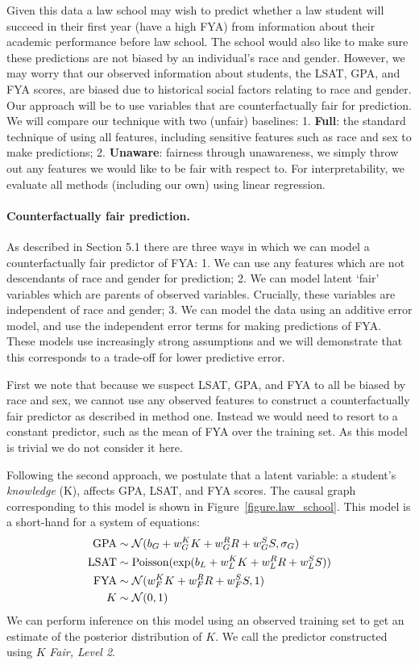 Given this data a law school may wish to predict whether a law student
will succeed in their first year (have a high FYA) from information about their academic performance 
before law school. The school would also like to make sure
these predictions are not biased by an individual's race and
gender. However, we may worry that our observed information about
students, the LSAT, GPA, and FYA scores, are biased due to historical
social factors relating to race and gender. Our approach will be to use variables that are counterfactually fair for prediction. We will compare our technique with two (unfair) baselines: 1. \textbf{Full}: the standard technique of using all features, including sensitive features such as race and sex to make predictions; 2. \textbf{Unaware}: fairness through unawareness, we simply throw out any features we would like to be fair with respect to. For interpretability, we evaluate all methods (including our own) using linear regression.


\paragraph{Counterfactually fair prediction.}
As described in Section 5.1 there are three ways in which we can model a counterfactually fair predictor of FYA: 1. We can use any features which are not descendants of race and gender for prediction; 2. We can model latent `fair' variables which are parents of observed variables. Crucially, these variables are independent of race and gender; 3. We can model the data using an additive error model, and use the independent error terms for making predictions of FYA. These models use increasingly strong assumptions and we will demonstrate that this corresponds to a trade-off for lower predictive error.

First we note that because we suspect LSAT, GPA, and FYA to all be biased by race and sex, we cannot use any observed features to construct a counterfactually fair predictor as described in method one. Instead we would need to resort to a constant predictor, such as the mean of FYA over the training set. As this model is trivial we do not consider it here. 

Following the second approach, we postulate that a latent variable: a student's \emph{knowledge} (K), affects GPA, LSAT, and FYA scores. The causal graph corresponding to this model is shown in Figure~\ref{figure.law_school}. This model is a short-hand for a system of equations:
\begin{align}
\mbox{GPA} &\sim {\cal N}(b_{G} + w_{G}^K K + w_{G}^R R + w_{G}^S S, \sigma_{G}) \nonumber \\
\mbox{LSAT} &\sim \textrm{Poisson}(\exp(b_{L} + w_{L}^K K + w_{L}^R R + w_{L}^S S)) \nonumber \\
\mbox{FYA} &\sim {\cal N}(w_{F}^K K + w_{F}^R R + w_{F}^S S, 1) \nonumber \\
K &\sim {\cal N}(0,1) \nonumber
\end{align}
We can perform inference on this model using an observed training set to get an estimate of the posterior distribution of $K$. We call the predictor constructed using $K$ \emph{Fair, Level 2}.

